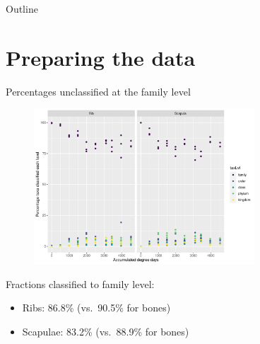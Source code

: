 \documentclass{beamer}
\date{May 2021}
\begin{document}

\begin{frame}{Outline}
  \tableofcontents
\end{frame}








\section[Preparation]{Preparing the data}



\begin{frame}{Percentages unclassified at the family level}

  \begin{center}
    \begin{figure}
      \includegraphics[width=3.25in]{swabs_family_perc_classif_by_add_type}
    \end{figure}
  \end{center}
  \vspace{-0.1in}
  {\footnotesize
  Fractions classified to family level:
  \begin{itemize}
    \item Ribs: 86.8\% (vs.\ 90.5\% for bones)
    \item Scapulae: 83.2\% (vs.\ 88.9\% for bones)
  \end{itemize}
  }
\end{frame}
\end{document}
